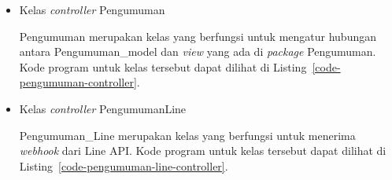 \begin{itemize}


\item Kelas \textit{controller} Pengumuman

Pengumuman merupakan kelas yang berfungsi untuk mengatur hubungan antara Pengumuman\_model dan \textit{view} yang ada di \textit{package} Pengumuman. Kode program untuk kelas tersebut dapat dilihat di Listing~\ref{code-pengumuman-controller}.



\item Kelas \textit{controller} PengumumanLine

Pengumuman\_Line merupakan kelas yang berfungsi untuk menerima \textit{webhook} dari Line API. Kode program untuk kelas tersebut dapat dilihat di Listing~\ref{code-pengumuman-line-controller}.



\end{itemize}

